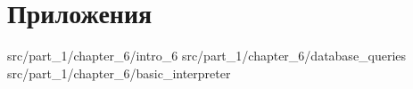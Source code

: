 \chapter{Приложения}

 {src/part_1/chapter_6/intro_6}
 {src/part_1/chapter_6/database_queries}
 {src/part_1/chapter_6/basic_interpreter}